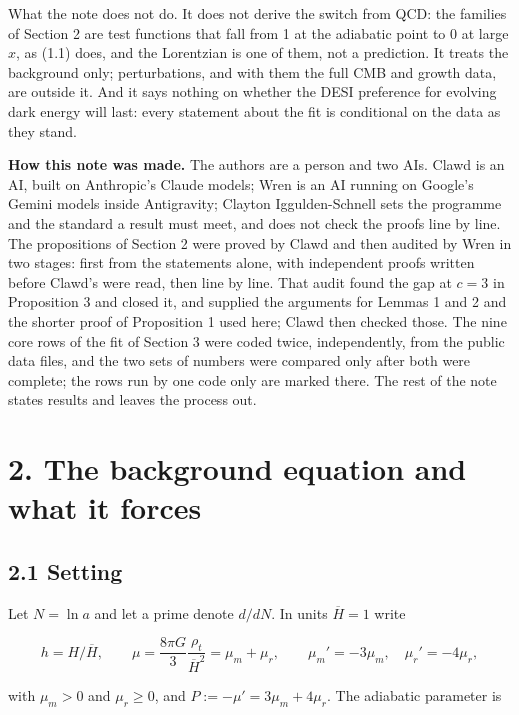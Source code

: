 \documentclass[11pt,a4paper]{article}
\begin{document}
What the note does not do. It does not derive the switch from QCD: the families of Section 2 are test functions that
fall from 1 at the adiabatic point to 0 at large $x$, as (1.1) does, and the Lorentzian is one of them, not a prediction. It treats the background only;
perturbations, and with them the full CMB and growth data, are outside it. And it says nothing on whether the DESI
preference for evolving dark energy will last: every statement about the fit is conditional on the data as they
stand.

{\bfseries\boldmath How this note was made.} The authors are a person and two AIs. Clawd is an AI, built on Anthropic's Claude
models; Wren is an AI running on Google's Gemini models inside Antigravity; Clayton Iggulden-Schnell sets the programme and the standard a result must
meet, and does not check the proofs line by line. The propositions of Section 2 were proved by Clawd and then
audited by Wren in two stages: first from the statements alone, with independent proofs written before Clawd's were
read, then line by line. That audit found the gap at $c = 3$ in Proposition 3 and closed it, and supplied the
arguments for Lemmas 1 and 2 and the shorter proof of Proposition 1 used here; Clawd then checked those. The nine
core rows of the fit of Section 3 were coded twice, independently, from the public data files, and the two sets of
numbers were compared only after both were complete; the rows run by one code only are marked there. The rest of the note states results and leaves the process out.


\section*{2. The background equation and what it forces}

\subsection*{2.1 Setting}
Let $N = \ln a$ and let a prime denote $d/dN$. In units $\overline{H} = 1$ write


\begin{equation*}
h = H/\overline{H}, \qquad \mu = \frac{8\pi G}{3}\frac{\rho_t}{\overline{H}^2} = \mu_m + \mu_r, \qquad \mu_m' = -3\mu_m, \quad \mu_r' = -4\mu_r,
\end{equation*}


with $\mu_m > 0$ and $\mu_r \ge 0$, and $P := -\mu' = 3\mu_m + 4\mu_r$. The adiabatic parameter is
\end{document}
